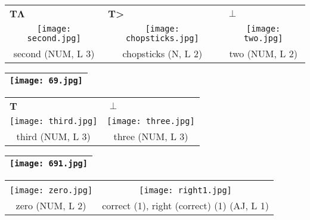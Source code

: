 \documentclass{tufte-book}
\newcommand{\sansnormal}{\sffamily\selectfont}
\begin{document}
\begin{fullwidth}
 \begin{table*}[h!]
\begin{tabular}{ccc}
 \multicolumn{1}{l}{\textbf{\sansnormal T}$\mathbf\Lambda$}&\multicolumn{1}{l}{\textbf{\sansnormal T>}}&  \multicolumn{1}{l}{$\pmb\perp$} \\
   \texttt{[image: second.jpg]}& \texttt{[image: chopsticks.jpg]}&  \texttt{[image: two.jpg]}\\
   second (NUM, L 3) & chopsticks (N, L 2)& two (NUM, L 2)\\%
 
 
 
\end{tabular}
\end{table*}

\begin{table}[h!]
\begin{tabular}{|c|}
\hline
\texttt{[image: 69.jpg]}\\
 
 \hline
\end{tabular}
\label{page:69}
\end{table}

 \begin{table*}[h!]
\begin{tabular}{cc}
 \multicolumn{1}{l}{\textbf{\sansnormal T}}&\multicolumn{1}{l}{$\pmb\perp$} \\
   \texttt{[image: third.jpg]}& \texttt{[image: three.jpg]}\\
   third (NUM, L 3) & three (NUM, L 3)\\%
  
 
 
 
\end{tabular}
\end{table*}
\newpage
\begin{table}[h!]
\begin{tabular}{|c|}
\hline
\texttt{[image: 691.jpg]}\\
 
 \hline
\end{tabular}
\label{page:691}
\end{table}

 \begin{table*}[h!]
\begin{tabular}{cc}
 \multicolumn{1}{l}{}&\multicolumn{1}{l}{} \\
   \texttt{[image: zero.jpg]}& \texttt{[image: right1.jpg]}\\
   zero (NUM, L 2) & correct (1), right (correct) (1) (AJ, L 1)\\%
  

\end{tabular}
\end{table*}
\end{fullwidth}
\end{document}
